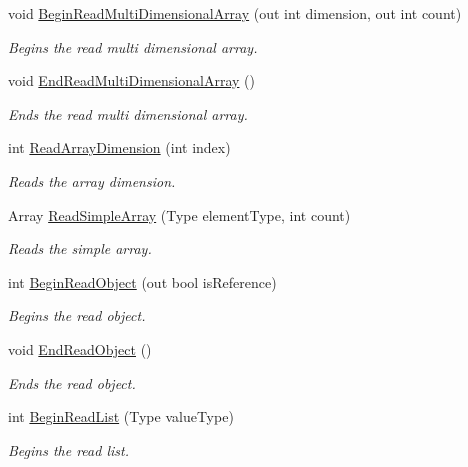 \begin{DoxyCompactItemize}
void \hyperlink{interface_serialization_1_1_i_storage_a27e63deec5c78fd5013d1d3b7607e04c}{Begin\+Read\+Multi\+Dimensional\+Array} (out int dimension, out int count)
\begin{DoxyCompactList}\small\item\em Begins the read multi dimensional array. \end{DoxyCompactList}\item 
void \hyperlink{interface_serialization_1_1_i_storage_a449e4d99ff1a5e1a792e22955fb13018}{End\+Read\+Multi\+Dimensional\+Array} ()
\begin{DoxyCompactList}\small\item\em Ends the read multi dimensional array. \end{DoxyCompactList}\item 
int \hyperlink{interface_serialization_1_1_i_storage_a395cc4c40bd55229df264d4187ebb018}{Read\+Array\+Dimension} (int index)
\begin{DoxyCompactList}\small\item\em Reads the array dimension. \end{DoxyCompactList}\item 
Array \hyperlink{interface_serialization_1_1_i_storage_abffb20a2280b9334bef338ccd2d7f5f5}{Read\+Simple\+Array} (Type element\+Type, int count)
\begin{DoxyCompactList}\small\item\em Reads the simple array. \end{DoxyCompactList}\item 
int \hyperlink{interface_serialization_1_1_i_storage_a2178c0c68457e13a45fa7e80fa345037}{Begin\+Read\+Object} (out bool is\+Reference)
\begin{DoxyCompactList}\small\item\em Begins the read object. \end{DoxyCompactList}\item 
void \hyperlink{interface_serialization_1_1_i_storage_af7f518486ceab2b980b6b90a16b33a97}{End\+Read\+Object} ()
\begin{DoxyCompactList}\small\item\em Ends the read object. \end{DoxyCompactList}\item 
int \hyperlink{interface_serialization_1_1_i_storage_afe6be681d819bbfd7db4078f29230020}{Begin\+Read\+List} (Type value\+Type)
\begin{DoxyCompactList}\small\item\em Begins the read list. \end{DoxyCompactList}\item 

\end{DoxyCompactItemize}
